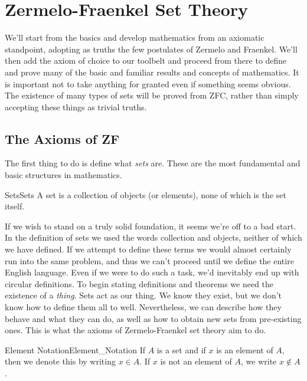 \chapter{Zermelo-Fraenkel Set Theory}
    We'll start from the basics and develop mathematics from an axiomatic
    standpoint, adopting as truths the few postulates of Zermelo and
    Fraenkel. We'll then add the axiom of choice to our toolbelt and
    proceed from there to define and prove many of the basic and familiar
    results and concepts of mathematics. It is important not to take anything
    for granted even if something seems obvious. The existence of many types
    of sets will be proved from ZFC, rather than simply accepting these
    things as trivial truths.
    \section{The Axioms of ZF}
        The first thing to do is define what \textit{sets} are. These are the
        most fundamental and basic structures in mathematics.
        \begin{fdefinition}{Sets}{Sets}
            A set is a collection of objects (or elements),
            none of which is the set itself.
        \end{fdefinition}
        If we wish to stand on a truly solid foundation, it seems we're off
        to a bad start. In the definition of sets we used the words
        \textrm{collection} and \textrm{objects}, neither of which we have
        defined. If we attempt to define these terms we would almost certainly
        run into the same problem, and thus we can't proceed until we define
        the entire English language. Even if we were to do such a task, we'd
        inevitably end up with circular definitions. To begin stating
        definitions and theorems we need the existence of a \textit{thing}.
        Sets act as our thing. We know they exist, but we don't know how to
        define them all to well. Nevertheless, we can describe how they behave
        and what they can do, as well as how to obtain new sets from
        pre-existing ones. This is what the axioms of Zermelo-Fraenkel set
        theory aim to do.
        \begin{fnotation}{Element Notation}{Element_Notation}
            If $A$ is a set and if $x$ is an element of $A$, then we
            denote this by writing $x\in{A}$. If $x$ is not an element of
            $A$, we write $x\notin{A}$.
        \end{fnotation}
